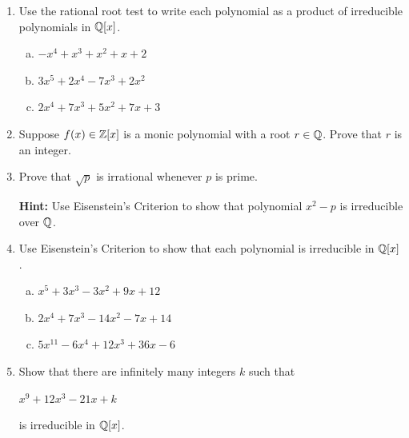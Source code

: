 \documentclass[11pt,fleqn,dvipsnames,usenames]{article}
\newcommand{\p}{\noindent}
\begin{document}
\p {\huge \S5.5 Problems}
\vsp
\begin{enumerate}[1.]
\item Use the rational root test to write each polynomial as a product of irreducible polynomials in $\mathbb{Q}[x]$.
\begin{enumerate}[(a)]
\item $-x^4 + x^3 + x^2 + x + 2$
\item $3x^5 + 2x^4 - 7x^3 + 2x^2$
\item $2x^4 + 7x^3 + 5x^2 + 7x + 3$
\end{enumerate}
\item Suppose $f(x)\in \mathbb{Z}[x]$ is a monic polynomial with a root $r\in \mathbb{Q}$.  Prove that $r$ is an integer.
\item Prove that $\sqrt{p}$ is irrational whenever $p$ is prime.

\textbf{Hint:} Use Eisenstein's Criterion to show that polynomial $x^2 - p$ is irreducible over $\mathbb{Q}$.

\item Use Eisenstein's Criterion to show that each polynomial is irreducible in $\mathbb{Q}[x]$.
\begin{enumerate}[(a)]
\item $x^5 + 3x^3 - 3x^2 + 9x + 12$
\item $2x^4 + 7x^3 - 14x^2 - 7x + 14$
\item $5x^{11} - 6x^4 + 12x^3 + 36x - 6$
\end{enumerate}
\item Show that there are infinitely many integers $k$ such that
\begin{center}
$x^9 + 12x^3 - 21x + k$
\end{center}
is irreducible in $\mathbb{Q}[x]$.
\end{enumerate}
\end{document}
